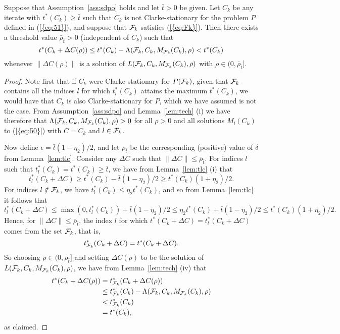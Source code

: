 \documentclass{siamltex}
\begin{document}
\begin{lemma} \label{lem:rhobar} Suppose that
  Assumption~\ref{ass:sdpo} holds and let $\bar{t}>0$ be given. Let
  $C_k$ be any iterate with $t^*(C_k) \ge \bar{t}$ such that $C_k$ is
  not Clarke-stationary for the problem $P$ defined in {(\ref{{eq:51}})},
  and suppose that ${{\cal F}}_k$ satisfies {(\ref{{eq:Fk}})}. Then there exists
  a threshold value $\bar{\rho}_{\bar{t}}>0$ (independent of $C_k$)
  such that
  \begin{equation} \label{eq:trstep} 
t^*(C_k+{\Delta C}(\rho)) \le t^*(C_k) -
    \Lambda({{\cal F}}_k,C_k,M_{{{\cal F}}_k}(C_k),\rho) < t^*(C_k)
\end{equation}
whenever $\|{\Delta C}(\rho)\|$ is a solution of $L({{\cal F}}_k,C_k,M_{{{\cal F}}_k}(C_k),\rho)$ with $\rho
\in (0,\bar{\rho}_{\bar{t}}]$.
\end{lemma}
\begin{proof}
  Note first that if $C_k$ were Clarke-stationary for $P({{\cal F}}_k)$,
  given that ${{\cal F}}_k$ contains all the indices $l$ for which
  $t^*_l(C_k)$ attains the maximum $t^*(C_k)$, we would have that
  $C_k$ is also Clarke-stationary for $P$, which we have assumed is
  not the case.  From Assumption~\ref{ass:sdpo} and Lemma~\ref{lem:tech} (i) we have therefore that
  $\Lambda({{\cal F}}_k,C_k,M_{{{\cal F}}_k}(C_k),\rho)>0$ for all $\rho>0$ and all
  solutions $M_l(C_k)$ to {(\ref{{eq:50}})} with $C=C_k$ and $l \in
  {{\cal F}}_k$.

  Now define $\epsilon = \bar{t}(1-\eta_2)/2$, and let
  $\bar{\rho}_{\bar{t}}$ be the corresponding (positive) value of
  $\delta$ from Lemma~\ref{lem:tlc}. Consider any ${\Delta C}$ such that $\|
  {\Delta C}\| \le \bar{\rho}_{\bar{t}}$. For indices $l$ such that
  $t^*_l(C_k) = t^*(C_k) \ge \bar{t}$, we have from
  Lemma~\ref{lem:tlc} (i) that
\[
t^*_l(C_k+{\Delta C}) \ge t^*(C_k) - \bar{t}(1-\eta_2)/2 \ge t^*(C_k)
(1+\eta_2)/2.
\]
For indices $l \notin {{\cal F}}_k$, we have $t^*_l(C_k) \le \eta_2
t^*(C_k)$, and so from Lemma~\ref{lem:tlc} it follows
that
\[
t^*_l(C_k+{\Delta C}) \le \max(0, t^*_l(C_k)) + \bar{t}(1-\eta_2)/2 \le
\eta_2 t^*(C_k) + \bar{t}(1-\eta_2)/2 \le t^*(C_k)
(1+\eta_2)/2.
\]
Hence, for $\| {\Delta C} \| \le \bar{\rho}_{\bar{t}}$, the index $l$ for
which $t^*(C_k + {\Delta C}) = t^*_l(C_k+{\Delta C})$ comes from the set ${{\cal F}}_k$,
that is,
\[
t^*_{{{\cal F}}_k} (C_k+{\Delta C}) = t^*(C_k+{\Delta C}).
\]
So choosing $\rho \in (0,\bar{\rho}_{\bar{t}}]$ and setting
${\Delta C}(\rho)$ to be the solution of $L({{\cal F}}_k,C_k,M_{{{\cal F}}_k}(C_k),\rho)$, we have
 from Lemma~\ref{lem:tech} (iv)  that 
\begin{align*}
t^*(C_k+{\Delta C}(\rho)) & = t^*_{{{\cal F}}_k} (C_k+{\Delta C}(\rho))  \\
& \le t^*_{{{\cal F}}_k}(C_k) - 
\Lambda ({{\cal F}}_k,C_k,M_{{{\cal F}}_k}(C_k),\rho) \\
&  < t^*_{{{\cal F}}_k}(C_k)  \\
& = t^*(C_k),
\end{align*}
as claimed.
\end{proof}
\end{document}
